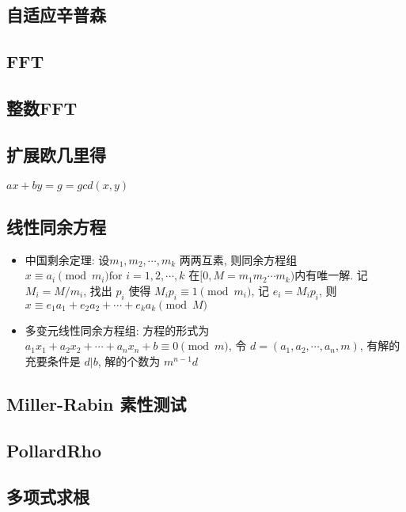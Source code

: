 \documentclass[landscape, twocolumn, 8pt, a4paper, twoside]{extarticle}
\begin{document}
\begin{spacing}{0.1}
\subsection{自适应辛普森}


\subsection{FFT}


\subsection{整数FFT}


\subsection{扩展欧几里得}
$ax + by = g = gcd(x, y)$


\subsection{线性同余方程}
\begin{itemize}
\item 中国剩余定理:
  设$m_1, m_2, \cdots, m_k$ 两两互素, 则同余方程组 $x \equiv a_i \pmod{m_i} \textrm{for $i = 1, 2, \cdots, k$}$
  在$[0, M = m_1 m_2 \cdots m_k)$内有唯一解. 
  记 $M_i = M / m_i$,
  找出 $p_i$ 使得 $M_i p_i \equiv 1 \pmod{m_i}$,
  记 $e_i = M_i p_i$,
  则 $x \equiv e_1 a_1 + e_2 a_2 + \cdots + e_k a_k \pmod{M}$
\item 多变元线性同余方程组:
  方程的形式为 $a_1 x_1 + a_2 x_2 + \cdots + a_n x_n + b \equiv 0 \pmod{m}$,
  令 $d = (a_1, a_2, \cdots, a_n, m)$,
  有解的充要条件是 $d | b$, 解的个数为 $m^{n - 1} d$
\end{itemize}

\subsection{Miller-Rabin 素性测试}


\subsection{PollardRho}


\subsection{多项式求根}



\end{spacing}
\end{document}
